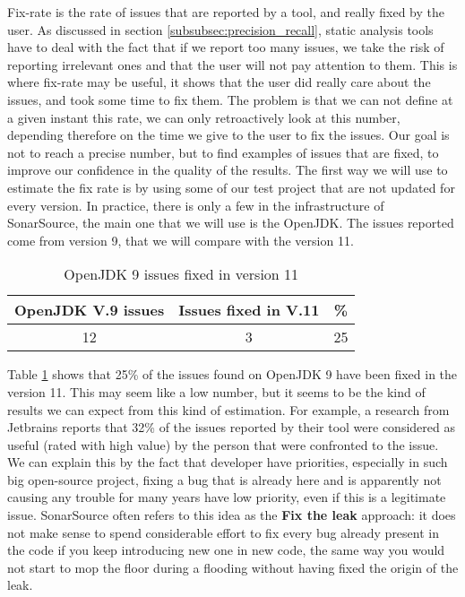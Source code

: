 Fix-rate is the rate of issues that are reported by a tool, and really fixed by the user. 
As discussed in section \ref{subsubsec:precision_recall}, static analysis tools have to deal with the fact that if we report too many issues, we take the risk of reporting irrelevant ones and that the user will not pay attention to them. 
This is where fix-rate may be useful, it shows that the user did really care about the issues, and took some time to fix them. \newline
The problem is that we can not define at a given instant this rate, we can only retroactively look at this number, depending therefore on the time we give to the user to fix the issues.
Our goal is not to reach a precise number, but to find examples of issues that are fixed, to improve our confidence in the quality of the results.\newline
The first way we will use to estimate the fix rate is by using some of our test project that are not updated for every version.
In practice, there is only a few in the infrastructure of SonarSource, the main one that we will use is the OpenJDK.
The issues reported come from version 9, that we will compare with the version 11.

\begin{table}[h]
	\centering
	\caption{OpenJDK 9 issues fixed in version 11}
	\label{table:openJDK_issues}
	\begin{tabular}{|c|c|c|}
		\hline
		\bf OpenJDK V.9  issues & \bf Issues fixed in V.11 & \bf \% \\ \hline
		12 &  3 &  25 \\ \hline
	\end{tabular}
\end{table}

Table \ref{table:openJDK_issues} shows that 25\% of the issues found on OpenJDK 9 have been fixed in the version 11. 
This may seem like a low number, but it seems to be the kind of results we can expect from this kind of estimation.
For example, a research from Jetbrains \cite{Bryksin:2018:DAK:3236454.3236457} reports that 32\% of the issues reported by their tool were considered as useful (rated with high value) by the person that were confronted to the issue. 
We can explain this by the fact that developer have priorities, especially in such big open-source project, fixing a bug that is already here and is apparently not causing any trouble for many years have low priority, even if this is a legitimate issue. 
SonarSource often refers to this idea as the \textbf{Fix the leak} approach: it does not make sense to spend considerable effort to fix every bug already present in the code if you keep introducing new one in new code, the same way you would not start to mop the floor during a flooding without having fixed the origin of the leak.

